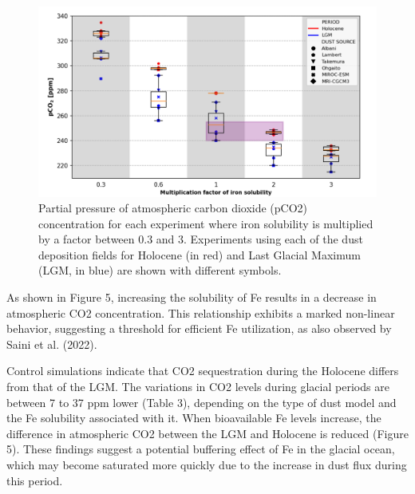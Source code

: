 \begin{figure}[h!]
    \includegraphics[scale=0.7]{../../Data_function/Function/PicturePaper/Figurex1_Subplot_CO2.png}
    \caption{Partial pressure of atmospheric carbon dioxide (pCO2) concentration for each experiment where iron solubility is multiplied by a factor between 0.3 and 3. Experiments using each of the dust deposition fields for Holocene (in red) and Last Glacial Maximum (LGM, in blue) are shown with different symbols.}
\end{figure} 


As shown in Figure 5, increasing the solubility of Fe results in a decrease in atmospheric CO2 concentration. This relationship exhibits a marked non-linear behavior, suggesting a threshold for efficient Fe utilization, as also observed by Saini et al. (2022).   

Control simulations indicate that CO2 sequestration during the Holocene differs from that of the LGM. The variations in CO2 levels during glacial periods are between 7 to 37 ppm lower (Table 3), depending on the type of dust model and the Fe solubility associated with it. When bioavailable Fe levels increase, the difference in atmospheric CO2 between the LGM and Holocene is reduced (Figure 5). These findings suggest a potential buffering effect of Fe in the glacial ocean, which may become saturated more quickly due to the increase in dust flux during this period. 

